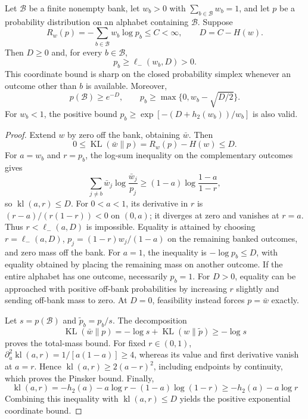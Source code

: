 \begin{theorem}
\label{ext:sharp-replay-certificate}
Let $\mathcal B$ be a finite nonempty bank, let $w_b>0$ with
$\sum_{b\in\mathcal B}w_b=1$, and let $p$ be a probability distribution on
an alphabet containing $\mathcal B$. Suppose
\[
 R_w(p)=-\sum_{b\in\mathcal B}w_b\log p_b\le C<\infty,
 \qquad D=C-H(w).
\]
Then $D\ge0$ and, for every $b\in\mathcal B$,
\begin{equation}
 \label{ext:binary-kl-retention}
 p_b\ge\ell_-(w_b,D)>0.
\end{equation}
This coordinate bound is sharp on the closed probability simplex whenever
an outcome other than $b$ is available. Moreover,
\[
 p(\mathcal B)\ge e^{-D},\qquad
 p_b\ge\max\{0,w_b-\sqrt{D/2}\}.
\]
For $w_b<1$, the positive bound
$p_b\ge\exp[-(D+h_2(w_b))/w_b]$ is also valid.
\end{theorem}
\begin{proof}
Extend $w$ by zero off the bank, obtaining $\bar w$. Then
\[
 0\le\operatorname{KL}(\bar w\|p)=R_w(p)-H(w)\le D.
\]
For $a=w_b$ and $r=p_b$, the log-sum inequality on the complementary
outcomes gives
\[
 \sum_{j\ne b}\bar w_j\log\frac{\bar w_j}{p_j}
 \ge(1-a)\log\frac{1-a}{1-r},
\]
so $\operatorname{kl}(a,r)\le D$. For $0<a<1$, its derivative in $r$ is
$(r-a)/(r(1-r))<0$ on $(0,a)$; it diverges at zero and vanishes at $r=a$.
Thus $r<\ell_-(a,D)$ is impossible. Equality is attained by choosing
$r=\ell_-(a,D)$, $p_j=(1-r)w_j/(1-a)$ on the remaining banked outcomes,
and zero mass off the bank. For $a=1$, the inequality is
$-\log p_b\le D$, with equality obtained by placing the remaining mass on
another outcome. If the entire alphabet has one outcome, necessarily
$p_b=1$. For $D>0$, equality can be approached with positive off-bank
probabilities by increasing $r$ slightly and sending off-bank mass to zero. At $D=0$, feasibility
instead forces $p=\bar w$ exactly.

Let $s=p(\mathcal B)$ and $\widetilde p_b=p_b/s$. The decomposition
\[
 \operatorname{KL}(\bar w\|p)
 =-\log s+\operatorname{KL}(w\|\widetilde p)\ge-\log s
\]
proves the total-mass bound. For fixed $r\in(0,1)$,
$\partial_a^2\operatorname{kl}(a,r)=1/[a(1-a)]\ge4$, whereas its value
and first derivative vanish at $a=r$. Hence
$\operatorname{kl}(a,r)\ge2(a-r)^2$, including endpoints by continuity,
which proves the Pinsker bound. Finally,
\[
 \operatorname{kl}(a,r)
 =-h_2(a)-a\log r-(1-a)\log(1-r)
 \ge-h_2(a)-a\log r
\]
Combining this inequality with $\operatorname{kl}(a,r)\le D$ yields the
positive exponential coordinate bound.
\end{proof}


